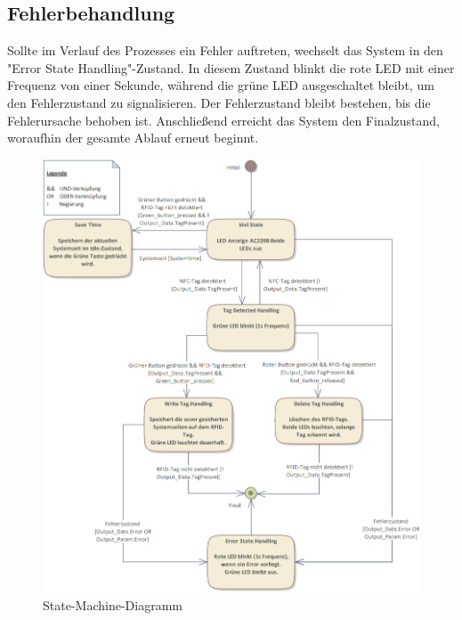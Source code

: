 \subsection*{Fehlerbehandlung}
\label{subsec:Fehlerbehandlung}

Sollte im Verlauf des Prozesses ein Fehler auftreten, wechselt das System in den "Error State Handling"-Zustand. In diesem Zustand blinkt die rote LED mit einer Frequenz von einer Sekunde, während die grüne LED ausgeschaltet bleibt, um den Fehlerzustand zu signalisieren. Der Fehlerzustand bleibt bestehen, bis die Fehlerursache behoben ist. Anschließend erreicht das System den Finalzustand, woraufhin der gesamte Ablauf erneut beginnt.

\begin{figure}[h!]
	\centering
	\includegraphics[width=1.0\textwidth]{images/StateMachine.png}
	\caption{State-Machine-Diagramm}
	\label{fig:StateMachineDiagramm}
\end{figure}

\clearpage




